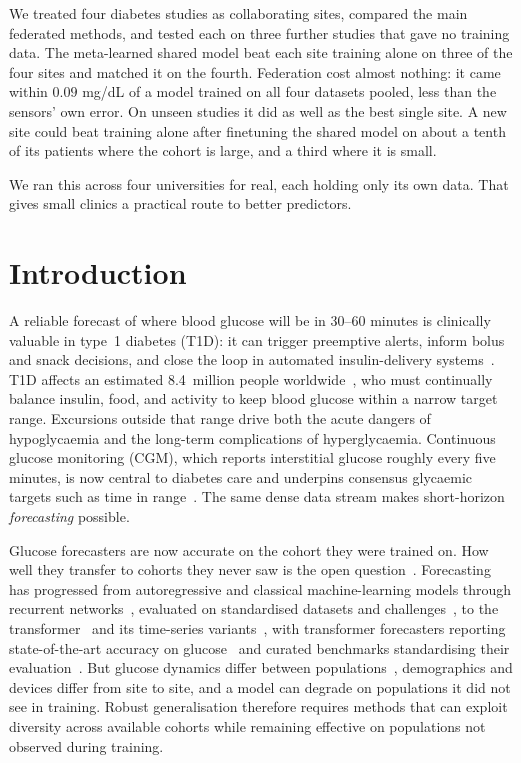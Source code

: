 \documentclass[10pt,letterpaper]{article}
\begin{document}
We treated four diabetes studies as collaborating sites, compared the main
federated methods, and tested each on three further studies that gave no
training data. The meta-learned shared model beat each site training alone
on three of the four sites and matched it on the fourth. Federation cost almost nothing: it came within $0.09$ mg/dL
of a model trained on all four datasets pooled, less than the sensors' own
error. On unseen studies it did as well as the best single site. A new site
could beat training alone after finetuning the shared model on about a tenth
of its patients where the cohort is large, and a third where it is small.

We ran this across four universities for real, each holding only its own data.
That gives small clinics a practical route to better predictors.

\clearpage
{}
\linenumbers

\section*{Introduction}

A reliable forecast of where blood glucose will be in 30--60 minutes is
clinically valuable in type~1 diabetes (T1D): it can trigger preemptive
alerts, inform bolus and snack decisions, and close the loop in automated
insulin-delivery systems~\cite{vettoretti2020advanced,bekiari2018ap}. T1D
affects an estimated 8.4~million people
worldwide~\cite{gregory2022t1dindex}, who must continually balance
insulin, food, and activity to keep blood glucose within a narrow target
range. Excursions outside that range drive both the acute dangers of
hypoglycaemia and the long-term complications of hyperglycaemia. Continuous
glucose monitoring (CGM), which reports interstitial glucose roughly every
five minutes, is now central to diabetes care and underpins consensus
glycaemic targets such as time in range~\cite{battelino2019tir}. The same
dense data stream makes short-horizon \emph{forecasting} possible.

Glucose forecasters are now accurate on the cohort they were trained on. How
well they transfer to cohorts they never saw is the open
question~\cite{ghimire2024generalize}. Forecasting has progressed from
autoregressive and classical machine-learning models through recurrent
networks~\cite{martinsson2020}, evaluated on standardised datasets and
challenges~\cite{marling2020ohio}, to the
transformer~\cite{vaswani2017attention} and its time-series
variants~\cite{zhou2021informer,wu2021autoformer}, with transformer
forecasters reporting state-of-the-art accuracy on
glucose~\cite{sergazinov2023gluformer} and curated benchmarks standardising
their evaluation~\cite{sergazinov2024glucobench}. But glucose dynamics differ
between populations~\cite{farahmand2025glumind}, demographics and devices
differ from site to site, and a model can degrade on populations it did not
see in training.
Robust generalisation therefore requires methods that can exploit diversity
across available cohorts while remaining effective on populations not
observed during training.
\end{document}
